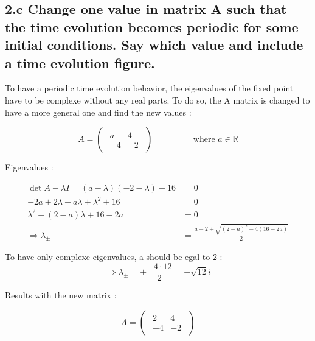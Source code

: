 \documentclass{cmc}
\begin{document}
\clearpage

\subsection*{2.c Change one value in matrix A such that the time evolution
  becomes periodic for some initial conditions. Say which value and include a
  time evolution figure.}

To have a periodic time evolution behavior, the eigenvalues of the fixed point have to be complexe without any real parts. To do so, the A matrix is changed to have a more general one and find the new values :

$$A = \begin{pmatrix}
	\begin{array}{rr}
		a & 4 \\ -4 & -2
	\end{array}
\end{pmatrix}
\hspace{2cm} \text{where } a \in \mathbb{R}$$

Eigenvalues :

\begin{align*}
	\det{A - \lambda I} = (a-\lambda)(-2-\lambda) + 16 &= 0 \\
	-2a + 2\lambda -a\lambda + \lambda^2 + 16 &= 0 \\
	\lambda^2 + (2-a) \lambda + 16 - 2a &= 0 \\
	\Rightarrow \lambda_{\pm} &= \frac{a-2 \pm \sqrt{(2-a)^2 -4(16-2a)}}{2}
\end{align*}

To have only complexe eigenvalues, a should be egal to 2 :
$$\Rightarrow\lambda_{\pm} = \pm \frac{-4\cdot 12}{2} = \pm \sqrt{12}i$$

Results with the new matrix :

$$A = \begin{pmatrix}
	\begin{array}{rr}
		2 & 4 \\ -4 & -2
	\end{array}
\end{pmatrix}$$
\end{document}
